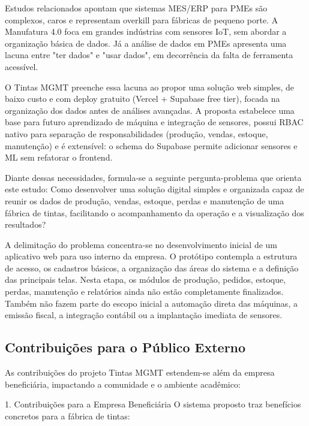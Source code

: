 \documentclass[12pt,a4paper]{article}
\begin{document}
Estudos relacionados apontam que sistemas MES/ERP para PMEs são complexos, caros e representam overkill para fábricas de pequeno porte. A Manufatura 4.0 foca em grandes indústrias com sensores IoT, sem abordar a organização básica de dados. Já a análise de dados em PMEs apresenta uma lacuna entre "ter dados" e "usar dados", em decorrência da falta de ferramenta acessível.

O Tintas MGMT preenche essa lacuna ao propor uma solução web simples, de baixo custo e com deploy gratuito (Vercel + Supabase free tier), focada na organização dos dados antes de análises avançadas. A proposta estabelece uma base para futuro aprendizado de máquina e integração de sensores, possui RBAC nativo para separação de responsabilidades (produção, vendas, estoque, manutenção) e é extensível: o schema do Supabase permite adicionar sensores e ML sem refatorar o frontend.

Diante dessas necessidades, formula-se a seguinte pergunta-problema que orienta este estudo: Como desenvolver uma solução digital simples e organizada capaz de reunir os dados de produção, vendas, estoque, perdas e manutenção de uma fábrica de tintas, facilitando o acompanhamento da operação e a visualização dos resultados?

A delimitação do problema concentra-se no desenvolvimento inicial de um aplicativo web para uso interno da empresa. O protótipo contempla a estrutura de acesso, os cadastros básicos, a organização das áreas do sistema e a definição das principais telas. Nesta etapa, os módulos de produção, pedidos, estoque, perdas, manutenção e relatórios ainda não estão completamente finalizados. Também não fazem parte do escopo inicial a automação direta das máquinas, a emissão fiscal, a integração contábil ou a implantação imediata de sensores.

\subsection{Contribuições para o Público Externo}
As contribuições do projeto Tintas MGMT estendem-se além da empresa beneficiária, impactando a comunidade e o ambiente acadêmico:

1. Contribuições para a Empresa Beneficiária
O sistema proposto traz benefícios concretos para a fábrica de tintas:
\end{document}

